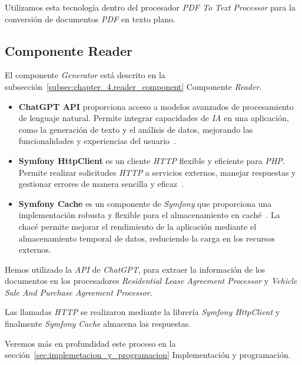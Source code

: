 Utilizamos esta tecnología dentro del procesador \textit{PDF To Text Processor} para la conversión de documentos
\textit{PDF} en texto plano.

\subsection*{Componente Reader}

El componente \textit{Generator} está descrito en la subsección~\ref{subsec:chapter_4.reader_component} Componente
\textit{Reader}.

\begin{itemize}
    \item \textbf{ChatGPT API} proporciona acceso a modelos avanzados de procesamiento de lenguaje natural.
    Permite integrar capacidades de \textit{IA} en una aplicación, como la generación de texto y el análisis de datos,
    mejorando las funcionalidades y experiencias del usuario~\cite{url_openai_api_documentation}.

    \item
    \textbf{Symfony HttpClient} es un cliente \textit{HTTP} flexible y eficiente para \textit{PHP}.
    Permite realizar solicitudes \textit{HTTP} a servicios externos, manejar respuestas y gestionar errores de
    manera sencilla y eficaz~\cite{url_symfony_http}.

    \item
    \textbf{Symfony Cache} es un componente de \textit{Symfony} que proporciona una implementación robusta y flexible
    para el almacenamiento en caché~\cite{url_symfony_cache}.
    La chacé permite mejorar el rendimiento de la aplicación mediante el almacenamiento temporal de datos,
    reduciendo la carga en los recursos externos.
\end{itemize}

Hemos utilizado la \textit{API} de \textit{ChatGPT}, para extraer la información de los documentos en los procesadores
\textit{Residential Lease Agreement Processor} y \textit{Vehicle Sale And Purchase Agreement Processor}.

Las llamadas \textit{HTTP} se realizaron mediante la librería \textit{Symfony HttpClient} y finalmente
\textit{Symfony Cache} almacena las respuestas.

Veremos más en profundidad este proceso en la sección~\ref{sec:implemetacion_y_programacion} Implementación y
programación.